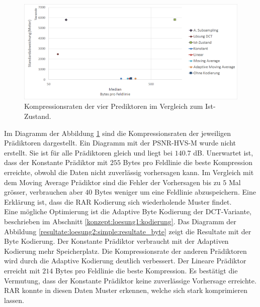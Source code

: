 \begin{figure}[!htbp]
	\center
	\includegraphics[width=1\textwidth,keepaspectratio]{./pictures/resultate/loesung2/variante0/resultate.png}
	\caption{Kompressionsraten der vier Prediktoren im Vergleich zum Ist-Zustand.}
	\label{resultate:loesung2:simple:resultate}
\end{figure}
Im Diagramm der Abbildung \ref{resultate:loesung2:simple:resultate} sind die Kompressionsraten der jeweiligen Prädiktoren dargestellt. Ein Diagramm mit der PSNR-HVS-M wurde nicht erstellt. Sie ist für alle Prädiktoren gleich und liegt bei $140.7$ dB. Unerwartet ist, dass der Konstante Prädiktor mit $255$ Bytes pro Feldlinie die beste Kompression erreichte, obwohl die Daten nicht zuverlässig vorhersagen kann. Im Vergleich mit dem Moving Average Prädiktor sind die Fehler der Vorhersagen 
bis zu $5$ Mal grösser, verbrauchen aber $40$ Bytes weniger um eine Feldlinie abzuspeichern. Eine Erklärung ist, dass die RAR Kodierung sich wiederholende Muster findet.\\
Eine mögliche Optimierung ist die Adaptive Byte Kodierung der DCT-Variante, beschrieben im Abschnitt \ref{konzept:loesung1:kodierung}. Das Diagramm der Abbildung \ref{resultate:loesung2:simple:resultate_byte} zeigt die Resultate mit der Byte Kodierung. Der Konstante Prädiktor verbraucht mit der Adaptiven Kodierung mehr Speicherplatz. Die Kompressionsrate der anderen Prädiktoren wird durch die Adaptive Kodierung deutlich verbessert. Der Lineare Prädiktor erreicht mit $214$ Bytes pro Feldlinie die beste Kompression. Es bestätigt die Vermutung, dass der Konstante Prädiktor keine zuverlässige Vorhersage erreichte. RAR konnte in diesen Daten Muster erkennen, welche sich stark komprimieren lassen.

